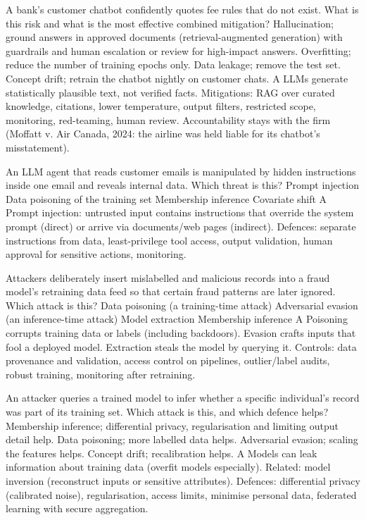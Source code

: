{A bank's customer chatbot confidently quotes fee rules that do not exist. What is this risk and what is the most effective combined mitigation?}
{Hallucination; ground answers in approved documents (retrieval-augmented generation) with guardrails and human escalation or review for high-impact answers.}
{Overfitting; reduce the number of training epochs only.}
{Data leakage; remove the test set.}
{Concept drift; retrain the chatbot nightly on customer chats.}
{A}
{LLMs generate statistically plausible text, not verified facts. Mitigations: RAG over curated knowledge, citations, lower temperature, output filters, restricted scope, monitoring, red-teaming, human review. Accountability stays with the firm (Moffatt v. Air Canada, 2024: the airline was held liable for its chatbot's misstatement).}

{An LLM agent that reads customer emails is manipulated by hidden instructions inside one email and reveals internal data. Which threat is this?}
{Prompt injection}
{Data poisoning of the training set}
{Membership inference}
{Covariate shift}
{A}
{Prompt injection: untrusted input contains instructions that override the system prompt (direct) or arrive via documents/web pages (indirect). Defences: separate instructions from data, least-privilege tool access, output validation, human approval for sensitive actions, monitoring.}

{Attackers deliberately insert mislabelled and malicious records into a fraud model's retraining data feed so that certain fraud patterns are later ignored. Which attack is this?}
{Data poisoning (a training-time attack)}
{Adversarial evasion (an inference-time attack)}
{Model extraction}
{Membership inference}
{A}
{Poisoning corrupts training data or labels (including backdoors). Evasion crafts inputs that fool a deployed model. Extraction steals the model by querying it. Controls: data provenance and validation, access control on pipelines, outlier/label audits, robust training, monitoring after retraining.}

{An attacker queries a trained model to infer whether a specific individual's record was part of its training set. Which attack is this, and which defence helps?}
{Membership inference; differential privacy, regularisation and limiting output detail help.}
{Data poisoning; more labelled data helps.}
{Adversarial evasion; scaling the features helps.}
{Concept drift; recalibration helps.}
{A}
{Models can leak information about training data (overfit models especially). Related: model inversion (reconstruct inputs or sensitive attributes). Defences: differential privacy (calibrated noise), regularisation, access limits, minimise personal data, federated learning with secure aggregation.}

